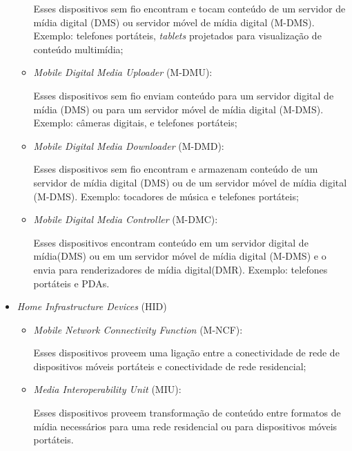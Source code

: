 \begin{itemize}
\begin{itemize}
		Esses dispositivos sem fio encontram e tocam conteúdo de um servidor de mídia digital (DMS) ou servidor móvel de mídia digital (M-DMS). Exemplo: telefones portáteis, \emph{tablets} projetados para visualização de conteúdo multimídia;
		\item \emph{Mobile Digital Media Uploader} (M-DMU): 

		Esses dispositivos sem fio enviam conteúdo para um servidor digital de mídia (DMS) ou para um servidor móvel de mídia digital (M-DMS). Exemplo: câmeras digitais, e telefones portáteis;
		\item \emph{Mobile Digital Media Downloader} (M-DMD): 

		Esses dispositivos sem fio encontram e armazenam conteúdo de um servidor de mídia digital (DMS) ou de um servidor móvel de mídia digital (M-DMS). Exemplo: tocadores de música e telefones portáteis;
		\item \emph{Mobile Digital Media Controller} (M-DMC): 

		Esses dispositivos encontram conteúdo em um servidor digital de mídia(DMS) ou em um servidor móvel de mídia digital (M-DMS) e o envia para renderizadores de mídia digital(DMR). Exemplo: telefones portáteis e PDAs.
	\end{itemize}
	\item \emph{Home Infrastructure Devices} (HID)
	\begin{itemize}
		\item \emph{Mobile Network Connectivity Function} (M-NCF): 

		Esses dispositivos proveem uma ligação entre a conectividade de rede de dispositivos móveis portáteis e conectividade de rede residencial;
		\item \emph{Media Interoperability Unit} (MIU): 

		Esses dispositivos proveem transformação de conteúdo entre formatos de mídia necessários para uma rede residencial ou para dispositivos móveis portáteis.
	\end{itemize}
\end{itemize}


